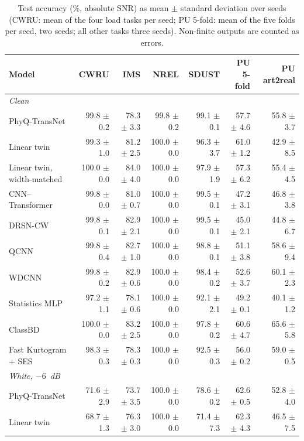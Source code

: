 \begin{table}[p]
\caption{Test accuracy (\%, absolute SNR) as mean $\pm$ standard deviation over seeds (CWRU: mean of the four load tasks per seed; PU 5-fold: mean of the five folds per seed, two seeds; all other tasks three seeds). Non-finite outputs are counted as errors.}\label{tab:std}
\centering\scriptsize\setlength{\tabcolsep}{3pt}
\begin{tabular}{lrrrrrr}
\toprule
Model & CWRU & IMS & NREL & SDUST & PU 5-fold & PU art2real \\
\midrule
\multicolumn{7}{l}{\emph{Clean}} \\
PhyQ-TransNet & 99.8 $\pm$ 0.2 & 78.3 $\pm$ 3.3 & 99.8 $\pm$ 0.2 & 99.1 $\pm$ 0.1 & 57.7 $\pm$ 4.6 & 55.8 $\pm$ 3.7 \\
Linear twin & 99.3 $\pm$ 1.0 & 81.2 $\pm$ 2.5 & 100.0 $\pm$ 0.0 & 96.3 $\pm$ 3.7 & 61.0 $\pm$ 1.2 & 42.9 $\pm$ 8.5 \\
Linear twin, width-matched & 100.0 $\pm$ 0.0 & 84.0 $\pm$ 4.0 & 100.0 $\pm$ 0.0 & 97.9 $\pm$ 1.9 & 57.3 $\pm$ 6.2 & 55.4 $\pm$ 4.5 \\
CNN--Transformer & 99.8 $\pm$ 0.0 & 81.0 $\pm$ 0.7 & 100.0 $\pm$ 0.0 & 99.5 $\pm$ 0.1 & 47.2 $\pm$ 3.1 & 46.8 $\pm$ 3.8 \\
DRSN-CW & 99.8 $\pm$ 0.1 & 82.9 $\pm$ 2.1 & 100.0 $\pm$ 0.0 & 99.5 $\pm$ 0.1 & 45.0 $\pm$ 2.1 & 44.8 $\pm$ 6.7 \\
QCNN & 99.8 $\pm$ 0.4 & 82.7 $\pm$ 1.0 & 100.0 $\pm$ 0.0 & 98.8 $\pm$ 0.1 & 51.1 $\pm$ 3.8 & 58.6 $\pm$ 9.4 \\
WDCNN & 99.8 $\pm$ 0.2 & 82.9 $\pm$ 0.6 & 100.0 $\pm$ 0.0 & 98.4 $\pm$ 0.2 & 52.6 $\pm$ 3.7 & 60.1 $\pm$ 2.3 \\
Statistics MLP & 97.2 $\pm$ 1.1 & 78.1 $\pm$ 0.6 & 100.0 $\pm$ 0.0 & 92.1 $\pm$ 2.1 & 49.2 $\pm$ 0.1 & 40.1 $\pm$ 1.2 \\
ClassBD & 100.0 $\pm$ 0.0 & 83.2 $\pm$ 2.5 & 100.0 $\pm$ 0.0 & 97.8 $\pm$ 0.2 & 60.6 $\pm$ 4.7 & 65.6 $\pm$ 5.8 \\
Fast Kurtogram + SES & 98.3 $\pm$ 0.3 & 78.3 $\pm$ 0.3 & 100.0 $\pm$ 0.0 & 92.5 $\pm$ 0.3 & 56.0 $\pm$ 0.2 & 59.0 $\pm$ 0.5 \\
\midrule
\multicolumn{7}{l}{\emph{White, $-6$~dB}} \\
PhyQ-TransNet & 71.6 $\pm$ 2.9 & 73.7 $\pm$ 3.5 & 100.0 $\pm$ 0.0 & 78.6 $\pm$ 0.2 & 62.6 $\pm$ 0.5 & 52.8 $\pm$ 4.0 \\
Linear twin & 68.7 $\pm$ 1.3 & 76.3 $\pm$ 3.0 & 100.0 $\pm$ 0.0 & 71.4 $\pm$ 7.3 & 62.3 $\pm$ 4.3 & 46.5 $\pm$ 7.5 \\

\end{tabular}
\end{table}
